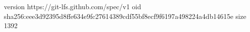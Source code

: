 version https://git-lfs.github.com/spec/v1
oid sha256:eee3d92395d8ffe634e9fc27614389cdf55bf8ecf9f6197a498224a4db14615e
size 1392

